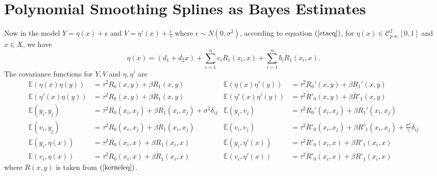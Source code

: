 \section{Polynomial Smoothing Splines as Bayes Estimates}
Now in the model $Y=\eta(x)+\epsilon$ and $V=\eta'(x)+\frac{\epsilon}{\gamma}$ where $\epsilon \sim N(0,\sigma^2)$, according to equation $(\ref{etaeq})$, for $\eta(x) \in \mathcal{C}_{p.w.}^{2}[0,1]$ and $x \in X$, we have
\begin{equation}
\eta(x)=(d_1+d_2x)+\sum_{i=1}^{n}c_iR_1(x_i,x)+\sum_{i=1}^{n}b_i\dot{R}_1(x_i,x).
\end{equation}
The covariance functions for $Y,V$ and $\eta, \eta'$ are
\begin{align*}
\mathbb{E}(\eta(x)\eta(y))&=\tau^2R_0(x,y)+\beta R_1(x,y) & \mathbb{E}(\eta(x)\eta'(y))&=\tau^2R_0'(x,y)+\beta R_1'(x,y) \\
\mathbb{E}(\eta'(x)\eta(y))&=\tau^2\dot{R}_0(x,y)+\beta\dot{R}_1(x,y) & \mathbb{E}(\eta'(x)\eta'(y))&=\tau^2\dot{R}'_0(x,y)+\beta\dot{R}'_1(x,y) \\
\mathbb{E}(y_i,y_j)&=\tau^2R_0(x_i,x_j)+\beta R_1(x_i,x_j) +\sigma^2\delta_{ij}& \mathbb{E}(y_i,v_j)&=\tau^2R_0'(x_i,x_j)+\beta R_1'(x_i,x_j) \\ 
\mathbb{E}(v_i,y_j)&=\tau^2\dot{R}_0(x_i,x_j)+\beta \dot{R}_1(x_i,x_j) & \mathbb{E}(v_i,v_j)&=\tau^2\dot{R}'_0(x_i,x_j)+\beta\dot{R}'_1(x_i,x_j) +\frac{\sigma^2}{\gamma}\delta_{ij}\\
\mathbb{E}(y_i,\eta(x))&=\tau^2 R_0(x_i,x)+\beta R_1(x_i,x)  & \mathbb{E}(y_i,\eta'(x))&=\tau^2 R'_0(x_i,x)+\beta R'_1(x_i,x)  \\
\mathbb{E}(v_i,\eta(x))&=\tau^2 \dot{R}_0(x_i,x)+\beta \dot{R}_1(x_i,x) & \mathbb{E}(v_i,\eta'(x))&=\tau^2\dot{R}'_0(x_i,x)+\beta \dot{R}'_1(x_i,x)
\end{align*}
where $R(x,y)$ is taken from $(\ref{kerneleq})$. 


